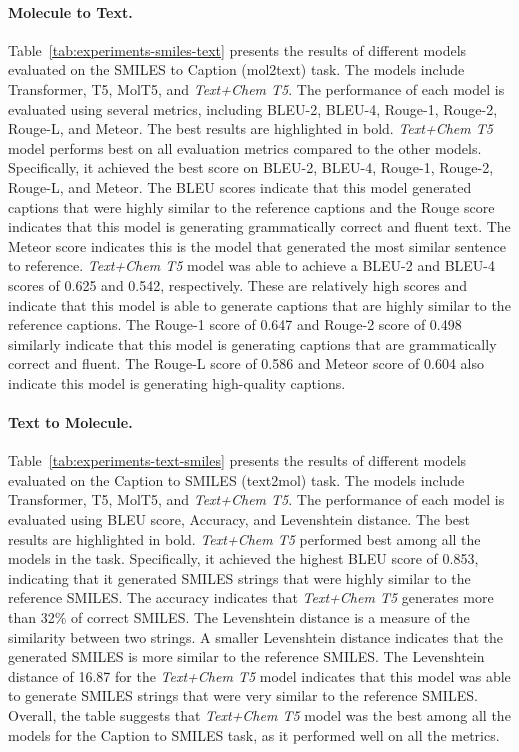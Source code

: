 \documentclass[nohyperref]{article}
\theoremstyle{plain}
\theoremstyle{definition}
\theoremstyle{remark}
\begin{document}
\paragraph{Molecule to Text.}
Table~\ref{tab:experiments-smiles-text} presents the results of different models evaluated on the SMILES to Caption (mol2text) task. The models include Transformer, T5, MolT5, and \textit{Text+Chem T5}. The performance of each model is evaluated using several metrics, including BLEU-2, BLEU-4, Rouge-1, Rouge-2, Rouge-L, and Meteor. The best results are highlighted in bold.
\emph{Text+Chem T5}  model performs best on all evaluation metrics compared to the other models. Specifically, it achieved the best score on BLEU-2, BLEU-4, Rouge-1, Rouge-2, Rouge-L, and Meteor. The BLEU scores indicate that this model generated captions that were highly similar to the reference captions and the Rouge score indicates that this model is generating grammatically correct and fluent text. The Meteor score indicates this is the model that generated the most similar sentence to reference.
\emph{Text+Chem T5}  model was able to achieve a BLEU-2 and BLEU-4 scores of 0.625 and 0.542, respectively. These are relatively high scores and indicate that this model is able to generate captions that are highly similar to the reference captions. The Rouge-1 score of 0.647 and Rouge-2 score of 0.498 similarly indicate that this model is generating captions that are grammatically correct and fluent. The Rouge-L score of 0.586 and Meteor score of 0.604 also indicate this model is generating high-quality captions.

\paragraph{Text to Molecule.}
Table~\ref{tab:experiments-text-smiles} presents the results of different models evaluated on the Caption to SMILES (text2mol) task. The models include Transformer, T5, MolT5, and \textit{Text+Chem T5}. The performance of each model is evaluated using BLEU score, Accuracy, and Levenshtein distance. The best results are highlighted in bold.
\emph{Text+Chem T5}  performed best among all the models in the task. Specifically, it achieved the highest BLEU score of 0.853, indicating that it generated SMILES strings that were highly similar to the reference SMILES. 
The accuracy indicates that \emph{Text+Chem T5}  generates more than 32\% of correct SMILES.
The Levenshtein distance is a measure of the similarity between two strings. A smaller Levenshtein distance indicates that the generated SMILES is more similar to the reference SMILES. The Levenshtein distance of 16.87 for the \emph{Text+Chem T5}  model indicates that this model was able to generate SMILES strings that were very similar to the reference SMILES.
Overall, the table suggests that \emph{Text+Chem T5}  model was the best among all the models for the Caption to SMILES task, as it performed well on all the metrics.
\end{document}
